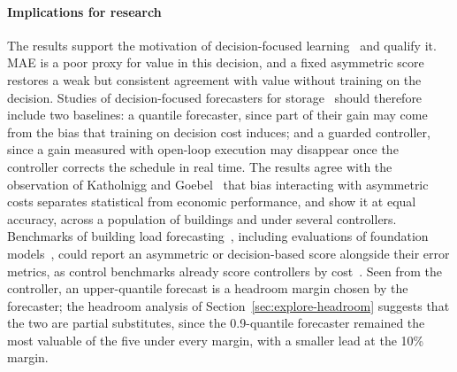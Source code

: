 \paragraph{Implications for research} The results support the motivation of decision-focused learning~\cite{donti2017task,elmachtoub2022spo,mandi2024dfl} and qualify it. MAE is a poor proxy for value in this decision, and a fixed asymmetric score restores a weak but consistent agreement with value without training on the decision. Studies of decision-focused forecasters for storage~\cite{kim2025neural,depoortere2026dfl,smets2025valueprice,saleptsis2026dfl} should therefore include two baselines: a quantile forecaster, since part of their gain may come from the bias that training on decision cost induces; and a guarded controller, since a gain measured with open-loop execution may disappear once the controller corrects the schedule in real time. The results agree with the observation of Katholnigg and Goebel~\cite{katholnigg2025impact} that bias interacting with asymmetric costs separates statistical from economic performance, and show it at equal accuracy, across a population of buildings and under several controllers. Benchmarks of building load forecasting~\cite{emami2023buildingsbench,miller2020gepiii}, including evaluations of foundation models~\cite{park2025tsfmbuildings,liao2025timegpt}, could report an asymmetric or decision-based score alongside their error metrics, as control benchmarks already score controllers by cost~\cite{vazquez2019citylearn}. Seen from the controller, an upper-quantile forecast is a headroom margin chosen by the forecaster; the headroom analysis of Section~\ref{sec:explore-headroom} suggests that the two are partial substitutes, since the 0.9-quantile forecaster remained the most valuable of the five under every margin, with a smaller lead at the 10\% margin.

